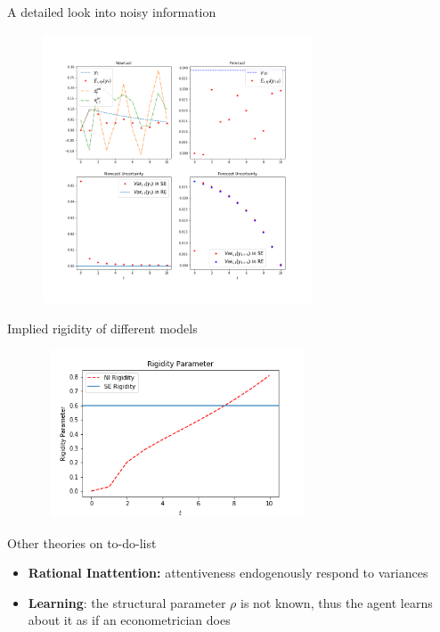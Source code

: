 \documentclass{beamer}
\begin{document}


\begin{frame}{A detailed look into noisy information}


\begin{figure}
	\includegraphics[height=8cm,width=8cm]{figures/ni_illustration} 
\end{figure}

\end{frame}


\begin{frame}{Implied rigidity of different models}


\begin{figure}
	\includegraphics[height=5cm,width=8cm]{figures/rigidity} 
\end{figure}

\end{frame}



\begin{frame}{Other theories on to-do-list}
\begin{itemize}
	\item \textbf{Rational Inattention:} attentiveness endogenously respond to variances
	\item \textbf{Learning}: the structural parameter $\rho$ is not known, thus the agent learns about it as if an econometrician does
\end{itemize}
\end{frame}
\end{document}
